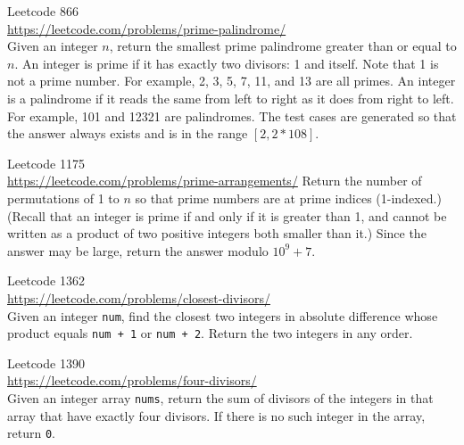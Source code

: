 \begin{ex}
  Leetcode 866 \\
  \url{https://leetcode.com/problems/prime-palindrome/}\\
  Given an integer $n$, return the smallest prime palindrome greater than or
  equal to $n$.
  An integer is prime if it has exactly two divisors: 1 and itself.
  Note that 1 is not a prime number.
  For example, 2, 3, 5, 7, 11, and 13 are all primes.
  An integer is a palindrome if it reads the same from left to right
  as it does from right to left.
  For example, 101 and 12321 are palindromes.
  The test cases are generated so that the answer always exists and is
  in the range $[2, 2 * 108]$.
\end{ex}

\begin{ex}
  Leetcode 1175 \\
  \url{https://leetcode.com/problems/prime-arrangements/}
  Return the number of permutations of 1 to $n$ so that prime numbers are at
  prime indices (1-indexed.)
  (Recall that an integer is prime if and only if it is greater than 1,
  and cannot be written as a product of two positive integers both smaller
  than it.)
  Since the answer may be large, return the answer modulo $10^9 + 7$.
\end{ex}

\begin{ex}
  Leetcode 1362 \\
  \url{https://leetcode.com/problems/closest-divisors/} \\
  Given an integer \verb!num!,
  find the closest two integers in absolute difference whose product equals
  \verb!num + 1! or \verb!num + 2!.
  Return the two integers in any order.
\end{ex}

\begin{ex}
  Leetcode 1390 \\
  \url{https://leetcode.com/problems/four-divisors/} \\
  Given an integer array \verb!nums!,
  return the sum of divisors of the integers in that array that have exactly
  four divisors.
  If there is no such integer in the array, return \verb!0!.
\end{ex}

